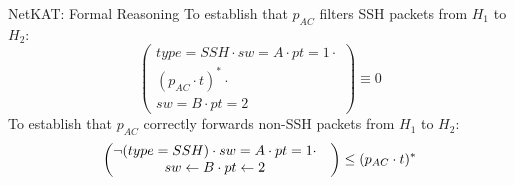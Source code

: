 \begin{frame}{NetKAT: Formal Reasoning}
    To establish that $p_{AC}$ filters SSH packets from $H_1$ to $H_2$:
    \begin{equation*}
        \begin{pmatrix}
            type = SSH \cdot sw = A \cdot pt = 1 \cdot \\
            (p_{AC}\cdot t) ^ * \cdot                  \\
            sw = B\cdot pt = 2
        \end{pmatrix}
        \equiv 0
    \end{equation*}
    \vspace{\baselineskip}
    To establish that $p_{AC}$ correctly forwards non-SSH packets from 
    $H_1$ to $H_2$:
    \begin{equation*}
        \begin{pmatrix}
            \neg(type = SSH) \cdot sw = A \cdot pt = 1 \cdot & \\
            sw \leftarrow B \cdot pt \leftarrow 2                          &
        \end{pmatrix}
        \leq (p_{AC}\cdot t)^ *
    \end{equation*}
\end{frame}